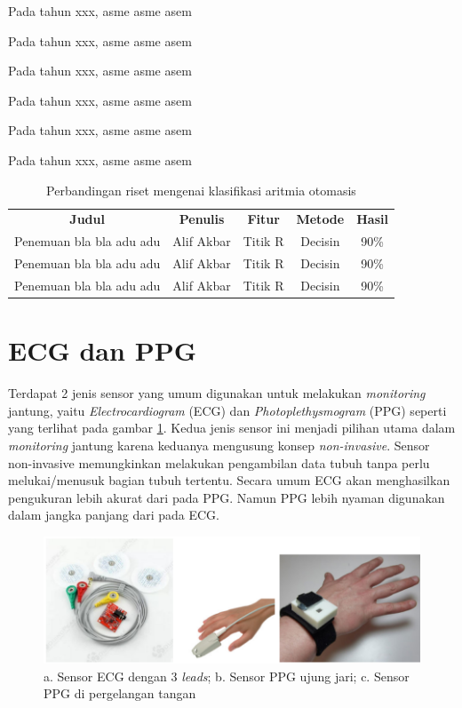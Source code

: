 Pada tahun xxx, asme asme asem

Pada tahun xxx, asme asme asem

Pada tahun xxx, asme asme asem

Pada tahun xxx, asme asme asem

Pada tahun xxx, asme asme asem

Pada tahun xxx, asme asme asem

\begin{table}[H]
\centering
	\begin{tabular}{|c|c|c|c|c|}
	\hline
	\rowcolor{gray}
	\textbf{Judul} & \textbf{Penulis} & \textbf{Fitur} & \textbf{Metode}  & \textbf{Hasil}\\
	\cline{1-5}
	Penemuan bla bla adu adu & Alif Akbar & Titik R & Decisin & 90\% \\
	\cline{1-5}
	Penemuan bla bla adu adu & Alif Akbar & Titik R & Decisin & 90\% \\
	\cline{1-5}
	Penemuan bla bla adu adu & Alif Akbar & Titik R & Decisin & 90\% \\
	\hline
	\end{tabular}
	\caption{Perbandingan riset mengenai klasifikasi aritmia otomasis}
	\label{table:research_comparison}
\end{table}

\section{ECG dan PPG}
Terdapat 2 jenis sensor yang umum digunakan untuk melakukan \textit{monitoring} jantung, yaitu \textit{Electrocardiogram} (ECG) dan \textit{Photoplethysmogram} (PPG) seperti yang terlihat pada gambar \ref{fig:ecg_n_ppg}. Kedua jenis sensor ini menjadi pilihan utama dalam \textit{monitoring} jantung karena keduanya mengusung konsep \textit{non-invasive}. Sensor non-invasive memungkinkan melakukan pengambilan data tubuh tanpa perlu melukai/menusuk bagian tubuh tertentu. Secara umum ECG akan menghasilkan pengukuran lebih akurat dari pada PPG. Namun PPG lebih nyaman digunakan dalam jangka panjang dari pada ECG.

\begin{figure}[H]
    \centering
    \includegraphics[scale=0.3]{images/sensors.png}
    \caption{a. Sensor ECG dengan 3 \textit{leads}; b. Sensor PPG ujung jari; c. Sensor PPG di pergelangan tangan}
    \label{fig:ecg_n_ppg}
\end{figure}

